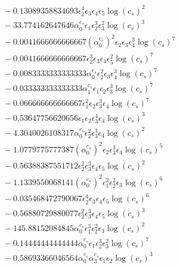 \documentclass[10pt]{article}
\begin{document}
\begin{align*}
&{}  - 0.13089358834693 \epsilon_{2}^{4} \epsilon_{3} \epsilon_{4} \epsilon_{5} \log{\left(c_{s} \right)}^{2} \\
&{}  - 33.774162647646 \alpha_{0}^{c_s} \epsilon_{1} \epsilon_{2}^{3} \epsilon_{3}^{2} \log{\left(c_{s} \right)}^{3} \\
&{}  - 0.0041666666666667 \left(\alpha_{0}^{c_s}\right)^{2} \epsilon_{2} \epsilon_{3} \epsilon_{4}^{3} \log{\left(c_{s} \right)}^{7} \\
&{}  - 0.0041666666666667 \epsilon_{2}^{3} \epsilon_{3} \epsilon_{4} \epsilon_{5}^{2} \log{\left(c_{s} \right)}^{7} \\
&{}  - 0.0083333333333333 \alpha_{0}^{c_s} \epsilon_{2}^{2} \epsilon_{3} \epsilon_{4}^{3} \log{\left(c_{s} \right)}^{7} \\
&{}  - 0.033333333333333 \alpha_{1}^{c_s} \epsilon_{1} \epsilon_{2} \epsilon_{3}^{3} \log{\left(c_{s} \right)}^{7} \\
&{}  - 0.066666666666667 \epsilon_{1}^{2} \epsilon_{2} \epsilon_{3}^{3} \epsilon_{4} \log{\left(c_{s} \right)}^{7} \\
&{}  - 0.53647756620656 \epsilon_{1} \epsilon_{2} \epsilon_{3}^{4} \epsilon_{4} \log{\left(c_{s} \right)}^{3} \\
&{}  - 4.3040026108317 \alpha_{0}^{c_s} \epsilon_{2}^{2} \epsilon_{3}^{3} \epsilon_{4} \log{\left(c_{s} \right)}^{2} \\
&{}  - 1.0779775777387 \left(\alpha_{0}^{c_s}\right)^{2} \epsilon_{2} \epsilon_{3}^{3} \epsilon_{4} \log{\left(c_{s} \right)}^{5} \\
&{}  - 0.56388387551712 \epsilon_{2}^{2} \epsilon_{3}^{3} \epsilon_{4} \epsilon_{5} \log{\left(c_{s} \right)}^{2} \\
&{}  - 1.1339550068141 \left(\alpha_{0}^{c_s}\right)^{2} \epsilon_{1}^{2} \epsilon_{2}^{2} \epsilon_{3} \log{\left(c_{s} \right)}^{6} \\
&{}  - 0.035468472790067 \epsilon_{2}^{4} \epsilon_{3} \epsilon_{4} \epsilon_{5} \log{\left(c_{s} \right)}^{6} \\
&{}  - 0.56880729880077 \epsilon_{2}^{2} \epsilon_{3}^{3} \epsilon_{4} \epsilon_{5} \log{\left(c_{s} \right)}^{3} \\
&{}  - 145.88152084845 \alpha_{0}^{c_s} \epsilon_{1}^{3} \epsilon_{2}^{2} \epsilon_{3} \log{\left(c_{s} \right)}^{2} \\
&{}  - 0.14444444444444 \alpha_{0}^{c_s} \epsilon_{1} \epsilon_{2}^{3} \epsilon_{3}^{2} \log{\left(c_{s} \right)}^{7} \\
&{}  - 0.58693366046564 \alpha_{0}^{c_s} \alpha_{3}^{c_s} \epsilon_{1} \epsilon_{2} \log{\left(c_{s} \right)}^{3} \\

\end{align*}
\end{document}
